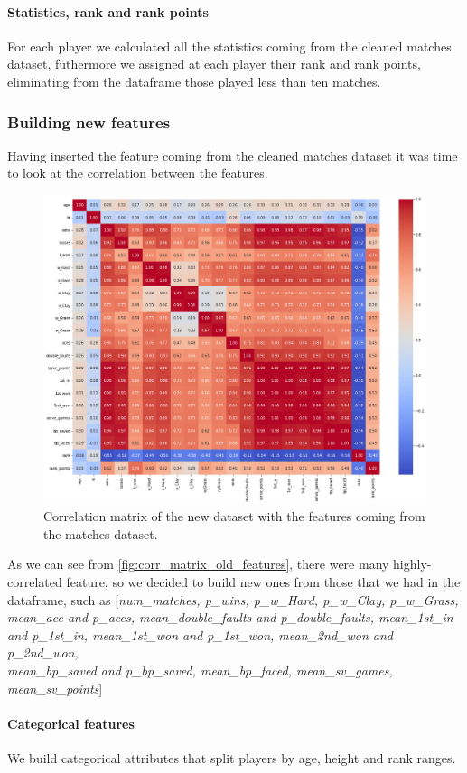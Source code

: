 \paragraph{Statistics, rank and rank points} For each player we calculated all the statistics coming from the cleaned matches dataset, futhermore we assigned at each player their rank and rank points, eliminating from the dataframe those played less than ten matches.

\subsubsection{Building new features}
Having inserted the feature coming from the cleaned matches dataset it was time to look at the correlation between the features.
\begin{figure}[H]
    \centering
    \includegraphics[width= 0.59\linewidth]{images/data_preparation/correlations_before_new_features.png}
    \caption{Correlation matrix of the new dataset with the features coming from the matches dataset.}
    \label{fig:corr_matrix_old_features}
\end{figure}
As we can see from \autoref{fig:corr_matrix_old_features}, there were many highly-correlated feature, so we decided to build new ones from those that we had in the dataframe, such as [\textit{num\_matches, p\_wins, p\_w\_Hard, p\_w\_Clay, p\_w\_Grass, mean\_ace and p\_aces, mean\_double\_faults and p\_double\_faults, mean\_1st\_in and p\_1st\_in, mean\_1st\_won and p\_1st\_won, mean\_2nd\_won and p\_2nd\_won,\\mean\_bp\_saved and p\_bp\_saved, mean\_bp\_faced, mean\_sv\_games, mean\_sv\_points}]

\paragraph{Categorical features} We build categorical attributes that split players by age, height and rank ranges.
\vspace{3mm}

